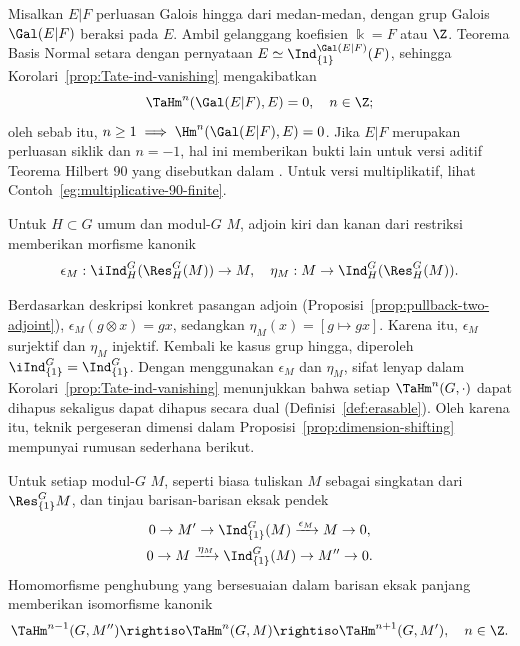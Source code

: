 \begin{example}\label{eg:additive-90-finite}
	Misalkan $E|F$ perluasan Galois hingga dari medan-medan, dengan grup Galois
	$\Gal(E|F)$ beraksi pada $E$. Ambil gelanggang koefisien
	$\Bbbk=F$ atau $\Z$. Teorema Basis Normal
	\cite[Teorema 9.5.6]{Li1} setara dengan pernyataan
	$E\simeq\Ind^{\Gal(E|F)}_{\{1\}}(F)$, sehingga
	Korolari~\ref{prop:Tate-ind-vanishing} mengakibatkan
	\[ \TaHm^n(\Gal(E|F), E) = 0, \quad n \in \Z; \]
	oleh sebab itu,
	$n\geq1\implies\Hm^n(\Gal(E|F),E)=0$. Jika $E|F$ merupakan perluasan
	siklik dan $n=-1$, hal ini memberikan bukti lain untuk versi aditif
	Teorema Hilbert 90 yang disebutkan dalam
	\cite[Teorema 9.6.10]{Li1}. Untuk versi multiplikatif, lihat
	Contoh~\ref{eg:multiplicative-90-finite}.
\end{example}

Untuk $H\subset G$ umum dan modul-$G$ $M$, adjoin kiri dan kanan dari restriksi
memberikan morfisme kanonik
\[ \epsilon_M: \iInd^G_H(\Res^G_H(M)) \to M, \quad \eta_M: M \to \Ind^G_H(\Res^G_H(M)). \]

Berdasarkan deskripsi konkret pasangan adjoin
(Proposisi~\ref{prop:pullback-two-adjoint}),
$\epsilon_M(g\otimes x)=gx$, sedangkan $\eta_M(x)=[g\mapsto gx]$.
Karena itu, $\epsilon_M$ surjektif dan $\eta_M$ injektif. Kembali ke kasus grup
hingga, diperoleh
$\iInd^G_{\{1\}}=\Ind^G_{\{1\}}$. Dengan menggunakan $\epsilon_M$ dan
$\eta_M$, sifat lenyap dalam Korolari~\ref{prop:Tate-ind-vanishing}
menunjukkan bahwa setiap $\TaHm^n(G,\cdot)$ dapat dihapus sekaligus dapat
dihapus secara dual (Definisi~\ref{def:erasable}). Oleh karena itu, teknik
pergeseran dimensi dalam Proposisi~\ref{prop:dimension-shifting} mempunyai
rumusan sederhana berikut.

\begin{corollary}\label{prop:Tate-dim-shift}
	Untuk setiap modul-$G$ $M$, seperti biasa tuliskan
	$M$ sebagai singkatan dari $\Res^G_{\{1\}}M$, dan tinjau barisan-barisan
	eksak pendek
	\begin{gather*}
		0 \to M' \to \Ind^G_{\{1\}}(M) \xrightarrow{\epsilon_M} M \to 0, \\
		0 \to M \xrightarrow{\eta_M} \Ind^G_{\{1\}}(M) \to M'' \to 0.
	\end{gather*}
	Homomorfisme penghubung yang bersesuaian dalam barisan eksak panjang
	memberikan isomorfisme kanonik
	\[ \TaHm^{n-1}(G, M'') \rightiso \TaHm^n(G, M) \rightiso \TaHm^{n+1}(G, M'), \quad n \in \Z. \]
\end{corollary}

